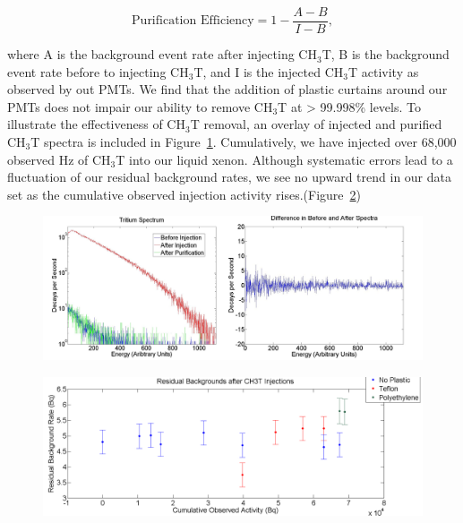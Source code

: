\begin{equation}
\text{Purification Efficiency} = 1 - \frac{A-B}{I-B},
\end{equation}

where A is the background event rate after injecting CH$_3$T, B is the background event rate before to injecting CH$_3$T, and I is the injected CH$_3$T activity as observed by out PMTs. We find that the addition of plastic curtains around our PMTs does not impair our ability to remove CH$_3$T at > 99.998\% levels. To illustrate the effectiveness of CH$_3$T removal, an overlay of injected and purified CH$_3$T spectra is included in Figure~\ref{BeforeAndAfterSpec}. Cumulatively, we have injected over 68,000 observed Hz of CH$_3$T into our liquid xenon. Although systematic errors lead to a fluctuation of our residual background rates, we see no upward trend in our data set as the cumulative observed injection activity rises.(Figure~\ref{UMDBackgroundOverTime})


\begin{figure}
\includegraphics[scale=.5]{UMDspectra.png} 
\label{BeforeAndAfterSpec}
\end{figure}

\begin{figure}
\includegraphics[scale=.35]{ResidualBackgroundCorrected_SystemErr.png} 
\label{UMDBackgroundOverTime}
\end{figure}

